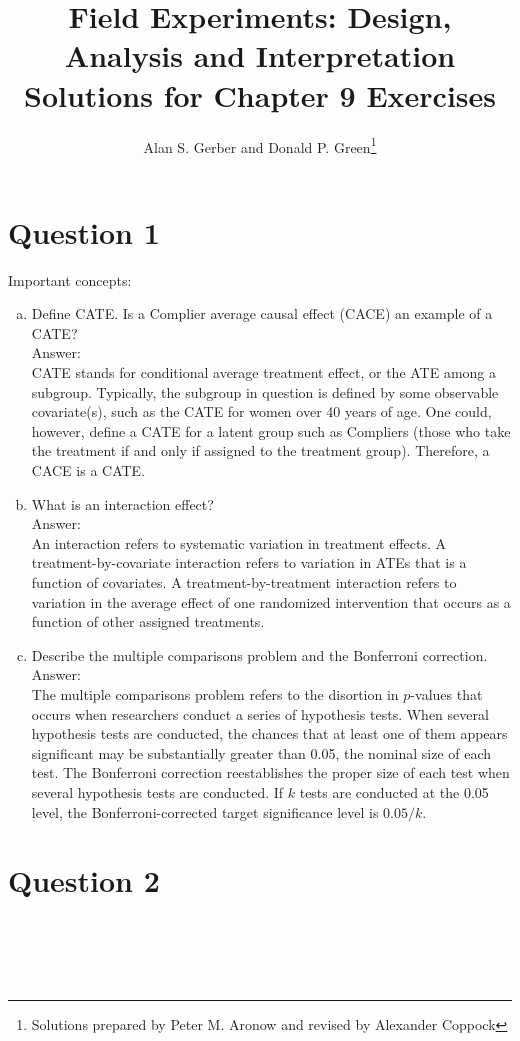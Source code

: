 \documentclass[11pt,notitlepage]{article}\usepackage[]{graphicx}\usepackage[]{color}
\title{Field Experiments: Design, Analysis and Interpretation \\
Solutions for Chapter 9 Exercises}
\author{Alan S. Gerber and Donald P. Green\footnote{Solutions prepared by Peter M. Aronow and revised by Alexander Coppock}}
\date{\vspace{-5ex}}
\makeatletter
\newenvironment{kframe}{%
 \def\at@end@of@kframe{}%
 \ifinner\ifhmode%
  \def\at@end@of@kframe{\end{minipage}}%
  \begin{minipage}{\columnwidth}%
 \fi\fi%
 \def\FrameCommand##1{\hskip\@totalleftmargin \hskip-\fboxsep
 \colorbox{shadecolor}{##1}\hskip-\fboxsep
     \hskip-\linewidth \hskip-\@totalleftmargin \hskip\columnwidth}%
 \MakeFramed {\advance\hsize-\width
   \@totalleftmargin\z@ \linewidth\hsize
   \@setminipage}}%
 {\par\unskip\endMakeFramed%
 \at@end@of@kframe}
\newenvironment{knitrout}{}{} %
\makeatother
\begin{document}
\maketitle


\section*{Question 1}
Important concepts:

\begin{enumerate}[a)]
\item Define CATE. Is a Complier average causal effect (CACE) an example of a CATE?\\
Answer:\\
CATE stands for conditional average treatment effect, or the ATE among a subgroup. Typically, the subgroup in question is defined by some observable covariate(s), such as the CATE for women over 40 years of age. One could, however, define a CATE for a latent group such as Compliers (those who take the treatment if and only if assigned to the treatment group). Therefore, a CACE is a CATE.

\item What is an interaction effect?\\
Answer:\\
An interaction refers to systematic variation in treatment effects. A treatment-by-covariate interaction refers to variation in ATEs that is a function of covariates. A treatment-by-treatment interaction refers to variation in the average effect of one randomized intervention that occurs as a function of other assigned treatments.

\item Describe the multiple comparisons problem and the Bonferroni correction.\\
Answer:\\
The multiple comparisons problem refers to the disortion in $p$-values that occurs when researchers conduct a series of hypothesis tests. When several hypothesis tests are conducted, the chances that at least one of them appears significant may be substantially greater than 0.05, the nominal size of each test. The Bonferroni correction reestablishes the proper size of each test when several hypothesis tests are conducted.   If $k$ tests are conducted at the 0.05 level, the Bonferroni-corrected target significance level is $0.05/k$.
\end{enumerate}

\section*{Question 2}
\begin{knitrout}
\color{fgcolor}\begin{kframe}
\begin{verbatim}





\end{verbatim}
\end{kframe}
\end{knitrout}
\end{document}

